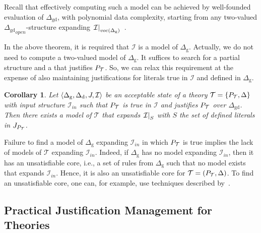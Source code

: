 \documentclass[11pt]{article}
\newcommand{\m}[1]{\ensuremath{#1}\xspace}
\newcommand{\I}{\m{\mathcal{I}}}
\newcommand{\Iin}{\m{\I_{in}}}
\newcommand{\theory}{\m{\mathcal{T}}}
\newcommand{\D}{\m{\Delta}}
\newcommand{\open}[1]{\m{#1_{open}}}
\newcommand{\tuple}[1]{\m{\left \langle #1 \right \rangle }}
\newcommand{\logicname}[1]{\text{\sc #1}\xspace}
\newcommand{\foid}{\logicname{FO(\ensuremath{ID})}}
\theoremstyle{plain}
\newtheorem{corollary}[thm]{Corollary}
\theoremstyle{definition}
\theoremstyle{example_basic}
\theoremstyle{example_contd}
\theoremstyle{plain}
\newcommand{\Dg}{\ensuremath{\D_\text{g}}\xspace}
\newcommand{\Dd}{\ensuremath{\D_\text{d}}\xspace}
\newcommand{\Dgd}{\ensuremath{\D_\text{gd}}\xspace}
\newcommand{\pt}{\ensuremath{P_\text{\theory}}\xspace}
\newcommand{\change}[1]{#1}
\begin{document}
Recall that effectively computing such a model \M can be achieved by well-founded evaluation of \Dgd, with polynomial data complexity, starting from any two-valued $\open{\Dgd}$-structure expanding $\restr{\I}{\vocf{\Dg}}$~\cite{jacm/ChenW96}.

In the above theorem, it is required that \I is a model of \Dg. Actually, we do not need to compute a two-valued model of \Dg. It suffices to search for a partial structure and a \justification that justifies \pt. So, we can relax this requirement at the expense of also maintaining justifications for literals true in \I and defined in \Dg.

\begin{corollary}\label{col:acceptable}
  Let $\tuple{\Dg,\Dd,\jgraph,\I}$ be an acceptable state of a theory
  $\theory = \{\pt,\D\}$ with input structure \Iin such that \pt is
  true in \I and \jgraph justifies \pt over \Dgd.
Then there exists a model \M of \theory that expands $\restr{\I}{S}$ with $S$ the set of defined literals in $\jgraph_{\pt}$. 
\end{corollary}

Failure to find a model of \Dg expanding \Iin in which \pt is true implies the lack of models of \theory expanding \Iin. Indeed, if \Dg has no model expanding \Iin, then it has an unsatisfiable core, i.e., a set of rules from \Dg such that no model exists that expands \Iin. Hence, it is also an unsatisfiable core for $\theory =(\pt,\D)$. To find an unsatisfiable core, one can, for example, use techniques described by~.


\subsection{\change{Practical Justification Management for \foid Theories}}\label{sec:default}

\newcommand{\rf}{\ensuremath{c_r}\xspace}
\newcommand{\crf}{\ensuremath{\cc_{\rf}}\xspace}
\end{document}
